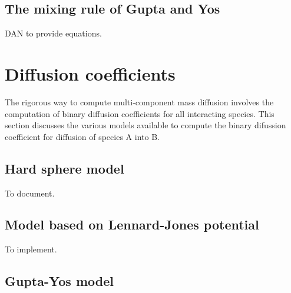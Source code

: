 \subsection{The mixing rule of Gupta and Yos}

DAN to provide equations.

\section{Diffusion coefficients}
The rigorous way to compute multi-component mass diffusion involves the computation of binary diffusion coefficients for all interacting species.
This section discusses the various models available to compute the binary
difussion coefficient for diffusion of species A into B.

\subsection{Hard sphere model}

To document.

\subsection{Model based on Lennard-Jones potential}

To implement.

\subsection{Gupta-Yos model}





